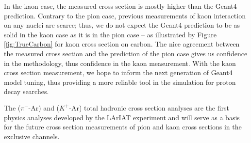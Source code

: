 In the kaon case, the measured cross section is mostly higher than the Geant4 prediction. Contrary to the pion case, previous measurements of kaon interaction on any nuclei are scarce; thus, we do not expect the Geant4 prediction to be as solid in the kaon case as it is in the pion case -- as illustrated  by Figure \ref{fig:TrueCarbon} for kaon cross section on carbon. The nice agreement between the measured cross section and the prediction of the pion case gives us confidence in the methodology, thus confidence in the kaon measurement. With the kaon cross section measurement, we hope to inform the next generation of Geant4 model tuning, thus providing a more reliable tool in the simulation for proton decay searches.

The ($\pi^-$-Ar) and ($K^+$-Ar) total hadronic cross section analyses are the first physics analyses developed by the LArIAT experiment and  will serve as a basis for the future cross section measurements of pion and kaon cross sections in the exclusive channels.

